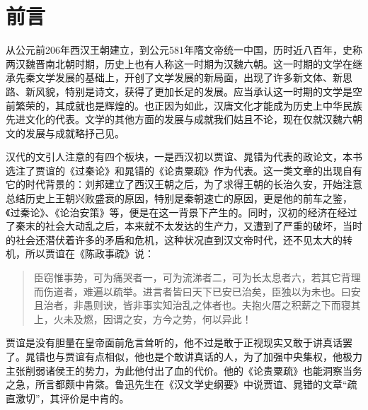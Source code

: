 \chapter*{前言}

从公元前206年西汉王朝建立，到公元581年隋文帝统一中国，历时近八百年，史称两汉魏晋南北朝时期，历史上也有人称这一时期为汉魏六朝。这一时期的文学在继承先秦文学发展的基础上，开创了文学发展的新局面，出现了许多新文体、新思路、新风貌，特别是诗文，获得了更加长足的发展。应当承认这一时期的文学是空前繁荣的，其成就也是辉煌的。也正因为如此，汉唐文化才能成为历史上中华民族先进文化的代表。文学的其他方面的发展与成就我们姑且不论，现在仅就汉魏六朝文的发展与成就略抒己见。

汉代的文引人注意的有四个板块，一是西汉初以贾谊、晁错为代表的政论文，本书选注了贾谊的《过秦论》和晁错的《论贵粟疏》作为代表。这一类文章的出现自有它的时代背景的：刘邦建立了西汉王朝之后，为了求得王朝的长治久安，开始注意总结历史上王朝兴败盛衰的原因，特别是秦朝速亡的原因，更是他的前车之鉴，《过秦论》、《论治安策》等，便是在这一背景下产生的。同时，汉初的经济在经过了秦末的社会大动乱之后，本来就不太发达的生产力，又遭到了严重的破坏，当时的社会还潜伏着许多的矛盾和危机，这种状况直到汉文帝时代，还不见太大的转机，所以贾谊在《陈政事疏》说：

\begin{quote}
臣窃惟事势，可为痛哭者一，可为流涕者二，可为长太息者六，若其它背理而伤道者，难遍以疏举。进言者皆曰天下已安已治矣，臣独以为未也。曰安且治者，非愚则谀，皆非事实知治乱之体者也。夫抱火厝之积薪之下而寝其上，火未及燃，因谓之安，方今之势，何以异此！
\end{quote}

贾谊是没有胆量在皇帝面前危言耸听的，他不过是敢于正视现实又敢于讲真话罢了。晁错也与贾谊有点相似，他也是个敢讲真话的人，为了加强中央集权，他极力主张削弱诸侯王的势力，为此他付出了血的代价。他的《论贵粟疏》也能洞察当务之急，所言都颇中肯綮。鲁迅先生在《汉文学史纲要》中说贾谊、晁错的文章“疏直激切”，其评价是中肯的。

